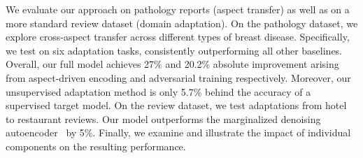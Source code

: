 We evaluate our approach on pathology reports (aspect transfer) as well as on a more standard review dataset (domain adaptation). On the pathology dataset, we explore cross-aspect transfer across different types of breast disease. Specifically, we test on six adaptation tasks, consistently outperforming all other baselines. Overall, our full model achieves 27\% and 20.2\% absolute improvement arising from aspect-driven encoding and adversarial training respectively. Moreover, our unsupervised adaptation method is only 5.7\% behind the accuracy of a supervised target model. On the review dataset, we test adaptations from hotel to restaurant reviews.
Our model outperforms the marginalized denoising autoencoder~\cite{chen2012marginalized} by 5\%.
Finally, we examine and illustrate the impact of individual components on the resulting performance. 